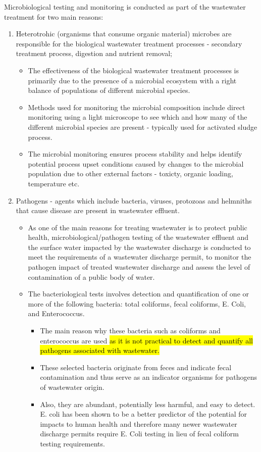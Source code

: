 Microbiological testing and monitoring is conducted as part of the wastewater treatment for two main reasons:
	\begin{enumerate}[1.]
		\item Heterotrohic (organisms that consume organic material) microbes are responsible for the biological wastewater treatment processes - secondary treatment process, digestion and nutrient removal; 
			\begin{itemize}
				\item The effectiveness of the biological wastewater treatment processes is primarily due to the presence of a microbial ecosystem with a right balance of populations of different microbial species.
				\item Methods used for monitoring the microbial composition include direct monitoring using a light microscope to see which and how many of the different microbial species are present - typically used for activated sludge process.
				\item The microbial monitoring ensures process stability and helps identify potential process upset conditions caused by changes to the microbial population due to other external factors - toxicty, organic loading, temperature etc.
			\end{itemize}
		\item Pathogens - agents which include bacteria, viruses, protozoas and helmniths that cause disease are present in wastewater effluent.
			\begin{itemize}
				\item As one of the main reasons for treating wastewater is to protect public health, microbiological/pathogen testing of the wastewater effluent and the surface water impacted by the wastewater discharge is conducted to meet the requirements of a wastewater discharge permit, to monitor the pathogen impact of treated wastewater discharge and assess the level of contamination of a public body of water.
				\item The bacteriological tests involves detection and quantification of one or more of the following bacteria:  total coliforms, fecal coliforms, E. Coli, and Enterococcus.  
					 \begin{itemize}
					      \item The main reason why these bacteria such as coliforms and enterococcus are used \hl{as it is not practical to detect and quantify all pathogens associated with wastewater.}  
					      	\item These selected bacteria originate from feces and indicate fecal contamination and thus serve as an indicator organisms for pathogens of wastewater origin.  
					      	\item Also, they are abundant, potentially less harmful, and easy to detect.  E. coli has been shown to be a better predictor of the potential for impacts to human health and therefore many newer wastewater discharge permits require E. Coli testing in lieu of fecal coliform testing requirements.
					   \end{itemize}
			\end{itemize}
	\end{enumerate}

